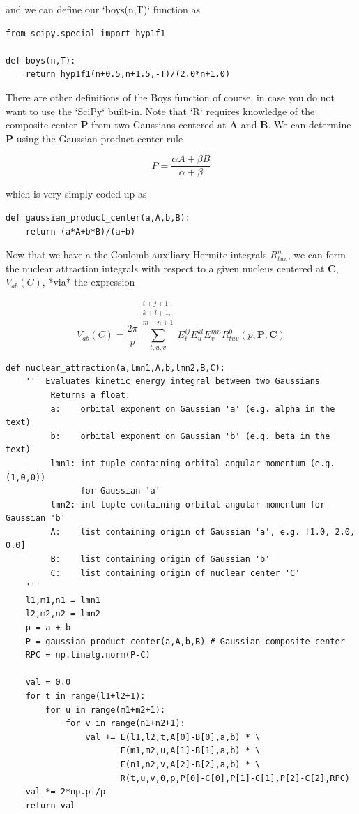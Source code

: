 and we can define our `boys(n,T)` function as

\begin{lstlisting}[style=MyPython]
from scipy.special import hyp1f1

def boys(n,T):
    return hyp1f1(n+0.5,n+1.5,-T)/(2.0*n+1.0) 
\end{lstlisting}

There are other definitions of the Boys function of course, in case you
do not want to use the `SciPy` built-in. Note that `R` requires
knowledge of the composite center $\mathbf{P}$ from two Gaussians
centered at $\mathbf{A}$ and $\mathbf{B}$. We can determine $\mathbf{P}$
using the Gaussian product center rule

\begin{equation}
  P 
  = 
  \frac{\alpha A + \beta B}{\alpha + \beta}
\end{equation}

which is very simply coded up as

\begin{lstlisting}[style=MyPython]
def gaussian_product_center(a,A,b,B):
    return (a*A+b*B)/(a+b)
\end{lstlisting}

Now that we have a the Coulomb auxiliary Hermite integrals
$R^{n}_{tuv}$, we can form the nuclear attraction integrals with respect
to a given nucleus centered at $\mathbf{C}$, $V_{ab}(C)$, *via* the
expression

\begin{equation}
  V_{ab}(C) 
  = 
  \frac{2\pi}{p} 
  \sum\limits_{t,u,v}^{\substack{i+j+1,\\k+l+1,\\m+n+1}} 
  E_t^{ij} E_u^{kl} E_v^{mn} R^0_{tuv}(p,\mathbf{P},\mathbf{C})
\end{equation}

\begin{lstlisting}[style=MyPython]
def nuclear_attraction(a,lmn1,A,b,lmn2,B,C):
    ''' Evaluates kinetic energy integral between two Gaussians
         Returns a float.
         a:    orbital exponent on Gaussian 'a' (e.g. alpha in the text)
         b:    orbital exponent on Gaussian 'b' (e.g. beta in the text)
         lmn1: int tuple containing orbital angular momentum (e.g. (1,0,0))
               for Gaussian 'a'
         lmn2: int tuple containing orbital angular momentum for Gaussian 'b'
         A:    list containing origin of Gaussian 'a', e.g. [1.0, 2.0, 0.0]
         B:    list containing origin of Gaussian 'b'
         C:    list containing origin of nuclear center 'C'
    '''
    l1,m1,n1 = lmn1 
    l2,m2,n2 = lmn2
    p = a + b
    P = gaussian_product_center(a,A,b,B) # Gaussian composite center
    RPC = np.linalg.norm(P-C)

    val = 0.0
    for t in range(l1+l2+1):
        for u in range(m1+m2+1):
            for v in range(n1+n2+1):
                val += E(l1,l2,t,A[0]-B[0],a,b) * \
                       E(m1,m2,u,A[1]-B[1],a,b) * \
                       E(n1,n2,v,A[2]-B[2],a,b) * \
                       R(t,u,v,0,p,P[0]-C[0],P[1]-C[1],P[2]-C[2],RPC)
    val *= 2*np.pi/p 
    return val
\end{lstlisting}

